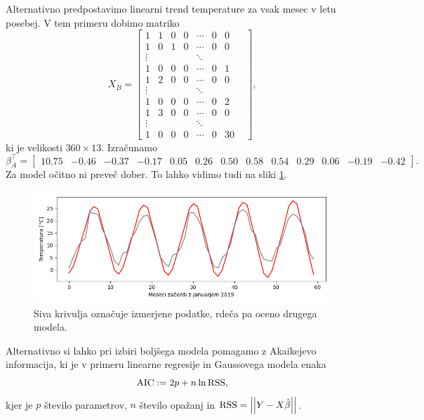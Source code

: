 \documentclass[12pt, a4paper]{article}
\begin{document}
Alternativno predpostavimo linearni trend temperature za 
vsak mesec v letu posebej. V tem primeru dobimo matriko
\[
    X_B = \begin{bmatrix}
        1 & 1 & 0 & 0 & \cdots & 0 & 0 \\
        1 & 0 & 1 & 0 & \cdots & 0 & 0 \\
        \vdots & & & & \ddots & & & \\
        1 & 0 & 0 & 0 & \cdots & 0 & 1 \\
        1 & 2 & 0 & 0 & \cdots & 0 & 0 \\
        \vdots & & & & \ddots & & & \\
        1 & 0 & 0 & 0 & \cdots & 0 & 2 \\
        1 & 3 & 0 & 0 & \cdots & 0 & 0 \\
        \vdots & & & & \ddots & & & \\
        1 & 0 & 0 & 0 & \cdots & 0 & 30 
    \end{bmatrix},
\]
ki je velikosti $360 \times 13$. Izračunamo
\setcounter{MaxMatrixCols}{20}
\footnotesize
\[
    \beta_A^\top = \begin{bmatrix}
        10.75 & -0.46 & -0.37 & -0.17 & 0.05 & 0.26 & 
        0.50 & 0.58 & 0.54 & 0.29 & 0.06 & -0.19 & -0.42
    \end{bmatrix}.
\]
\normalsize
Za model očitno ni preveč dober. To lahko vidimo tudi na sliki 
\ref{png:drugi}.

\begin{figure}[H]
    \centering
    \includegraphics[width=14cm]{Slike/drugi_model.png}
    \caption{Siva krivulja označuje izmerjene podatke, rdeča pa oceno 
    drugega modela.}
    \label{png:drugi}
\end{figure}

Alternativno si lahko pri izbiri boljšega modela pomagamo z Akaikejevo informacija, 
ki je v primeru linearne regresije in Gaussovega modela enaka
\[
    \operatorname{AIC} := 2p + n \ln \operatorname{RSS},
\]
kjer je $p$ število parametrov, $n$ število opažanj in $\operatorname{RSS} = \left\lvert\left\lvert Y - X\hat \beta\right\rvert\right\rvert$.
\end{document}
